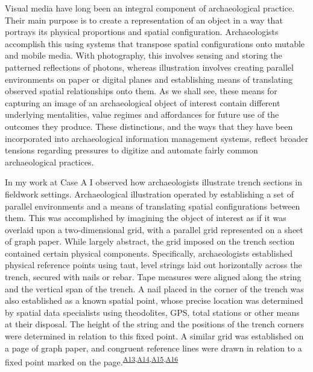 \documentclass[
]{article}
\begin{document}
Visual media have long been an integral component of archaeological
practice. Their main purpose is to create a representation of an object
in a way that portrays its physical proportions and spatial
configuration. Archaeologists accomplish this using systems that
transpose spatial configurations onto mutable and mobile media. With
photography, this involves sensing and storing the patterned reflections
of photons, whereas illustration involves creating parallel environments
on paper or digital planes and establishing means of translating
observed spatial relationships onto them. As we shall see, these means
for capturing an image of an archaeological object of interest contain
different underlying mentalities, value regimes and affordances for
future use of the outcomes they produce. These distinctions, and the
ways that they have been incorporated into archaeological information
management systems, reflect broader tensions regarding pressures to
digitize and automate fairly common archaeological practices.

In my work at Case A I observed how archaeologists illustrate trench
sections in fieldwork settings. Archaeological illustration operated by
establishing a set of parallel environments and a means of translating
spatial configurations between them. This was accomplished by imagining
the object of interest as if it was overlaid upon a two-dimensional
grid, with a parallel grid represented on a sheet of graph paper. While
largely abstract, the grid imposed on the trench section contained
certain physical components. Specifically, archaeologists established
physical reference points using taut, level strings laid out
horizontally across the trench, secured with nails or rebar. Tape
measures were aligned along the string and the vertical span of the
trench. A nail placed in the corner of the trench was also established
as a known spatial point, whose precise location was determined by
spatial data specialists using theodolites, GPS, total stations or other
means at their disposal. The height of the string and the positions of
the trench corners were determined in relation to this fixed point. A
similar grid was established on a page of graph paper, and congruent
reference lines were drawn in relation to a fixed point marked on the
page.\textsuperscript{\hyperref[sec-A13]{A13},\hyperref[sec-A14]{A14},\hyperref[sec-A15]{A15},\hyperref[sec-A16]{A16}}
\end{document}
